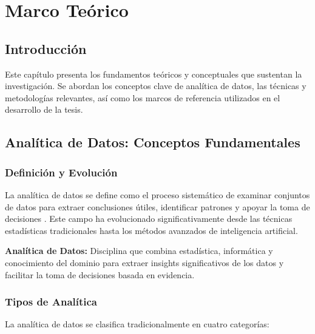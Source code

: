 
\chapter{Marco Teórico}

\section{Introducción}

Este capítulo presenta los fundamentos teóricos y conceptuales que sustentan la investigación. Se abordan los conceptos clave de analítica de datos, las técnicas y metodologías relevantes, así como los marcos de referencia utilizados en el desarrollo de la tesis.

\section{Analítica de Datos: Conceptos Fundamentales}

\subsection{Definición y Evolución}

La analítica de datos se define como el proceso sistemático de examinar conjuntos de datos para extraer conclusiones útiles, identificar patrones y apoyar la toma de decisiones \citep{referencia_ejemplo}. Este campo ha evolucionado significativamente desde las técnicas estadísticas tradicionales hasta los métodos avanzados de inteligencia artificial.

\begin{definicion}
\textbf{Analítica de Datos:} Disciplina que combina estadística, informática y conocimiento del dominio para extraer insights significativos de los datos y facilitar la toma de decisiones basada en evidencia.
\end{definicion}

\subsection{Tipos de Analítica}

La analítica de datos se clasifica tradicionalmente en cuatro categorías:

